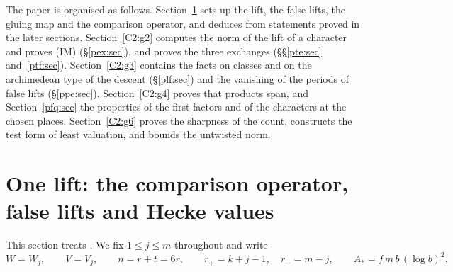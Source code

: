 \documentclass[10pt]{amsart}
\theoremstyle{definition}
\theoremstyle{remark}
\providecommand{\auT}{\mathcal T}
\providecommand{\audT}{d_{\auT}}
\begin{document}
The paper is organised as follows. Section~\ref{po:sec} sets up the lift, the false lifts, the
gluing map and the comparison operator, and deduces {\cite[Propositions~14.41 and~14.42]{P46}} from statements proved in the later sections. Section~\ref{C2:g2} computes the
norm of the lift of a character and proves (IM) (\S\ref{pex:sec}), and proves the three exchanges
(\S\S\ref{pte:sec} and~\ref{ptf:sec}). Section~\ref{C2:g3} contains the facts on classes and on
the archimedean type of the descent (\S\ref{plf:sec}) and the vanishing of the periods of false
lifts (\S\ref{ppe:sec}). Section~\ref{C2:g4} proves that products span, and
Section~\ref{pfq:sec} the properties of the first factors and of the characters at the chosen
places. Section~\ref{C2:g6} proves the sharpness of the count, constructs the test form of least
valuation, and bounds the untwisted norm.


\providecommand{\auO}{\mathcal O}
\providecommand{\auI}{\mathcal I}
\providecommand{\auU}{\mathrm U}
\providecommand{\auGL}{\mathrm{GL}}
\providecommand{\auHom}{\operatorname{Hom}}
\providecommand{\auEnd}{\operatorname{End}}
\providecommand{\auAut}{\operatorname{Aut}}
\providecommand{\auNm}{\operatorname{Nm}}
\providecommand{\auA}{\mathbb A}
\providecommand{\auF}{\mathbb F}
\providecommand{\auPl}{\Phi}
\providecommand{\auG}{\overline G}
\providecommand{\audT}{d_{\mathcal T}}
\providecommand{\aubud}{\mathrm{bud}}
\providecommand{\auhdir}{h_{\mathrm{dir}}}
\providecommand{\ausinf}{s_\infty}
\providecommand{\ausfin}{s_{\mathrm{fin}}}
\providecommand{\aueu}{\varepsilon_{\mathrm u}}
\providecommand{\aurd}{\mathrm{rd}_E}
\providecommand{\aubar}[1]{\overline{#1}}
\providecommand{\auf}[1]{\texttt{#1}}
\providecommand{\psrho}{\varrho}
\providecommand{\pao}{\mathfrak o}
\providecommand{\plone}{\mathbf 1}
\providecommand{\plgb}[2]{\|#2\|_{#1}}
\providecommand{\poA}{\mathcal A}
\providecommand{\poZ}{\mathcal Z}
\providecommand{\poT}{\mathbb T}
\providecommand{\popr}{\operatorname{pr}}
\providecommand{\poglue}{\operatorname{glue}}
\providecommand{\poran}{\operatorname{im}}
\providecommand{\podel}{\delta}
\providecommand{\pop}{\mathsf p}
\providecommand{\pog}{\mathsf g}
\providecommand{\poAA}{A_\ast}

\section{One lift: the comparison operator, false lifts and Hecke values}\label{po:sec}

This section treats {\cite[Propositions~14.41 and~14.42]{P46}}. We fix $1\le j\le m$
throughout and write
\[
W=W_j,\qquad V=V_j,\qquad n=r+t=6r,\qquad r_+=k+j-1,\quad r_-=m-j,\qquad
\poAA=f\,m\,b\,(\log b)^2 .
\]
\end{document}
